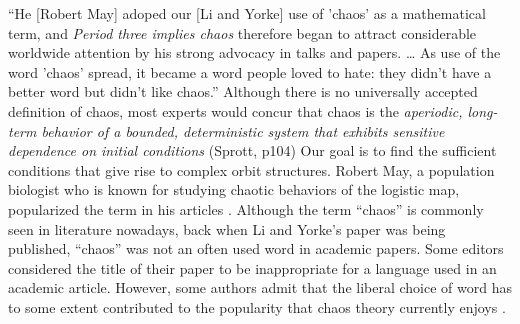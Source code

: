 \documentclass[12pt,twoside,draft]{book}
\begin{document}
``He [Robert May] adoped our [Li and Yorke] use of 'chaos' as a mathematical term, and \textit{Period three implies chaos} therefore began to attract considerable worldwide attention by his strong advocacy in talks and papers.
\ldots
As use of the word 'chaos' spread, it became a word people loved to hate: they didn't have a better word but didn't like chaos.''
\citep[205]{ueda-abraham}
Although there is no universally accepted definition of chaos, most experts would concur that chaos is the {\it aperiodic, long-term behavior of a bounded, deterministic system that exhibits sensitive dependence on initial conditions} (Sprott, p104)
Our goal is to find the sufficient conditions that give rise to complex orbit structures.
Robert May, a population biologist who is known for studying chaotic behaviors of the logistic map, popularized the term in his articles \citeyearpar{may1,may2}.
Although the term ``chaos'' is commonly seen in literature nowadays, back when Li and Yorke's paper was being published, ``chaos'' was not an often used word in academic papers.
  Some editors considered the title of their paper to be inappropriate for a language used in an academic article.
  However, some authors admit that the liberal choice of word has to some extent contributed to the popularity that chaos theory currently enjoys \citep[``Exploring Chaos on an Interval'']{ueda-abraham}.
\end{document}
